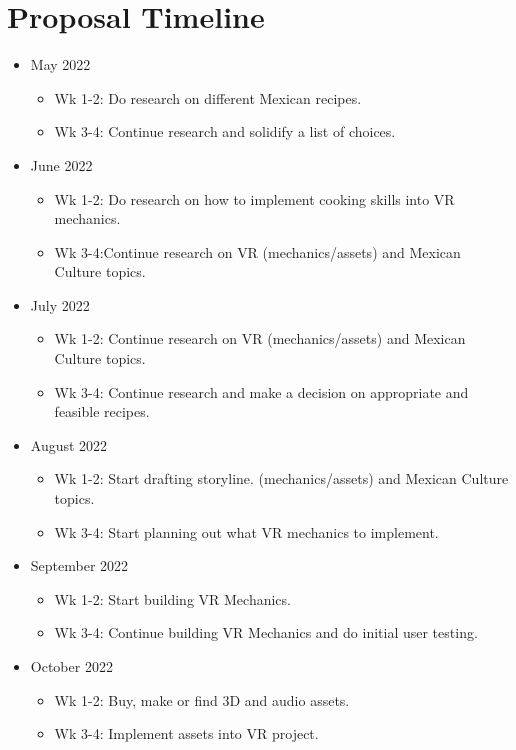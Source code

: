 \documentclass[11pt,twocolumn]{article}
\begin{document}
 \section{Proposal Timeline}
 \begin{itemize}
 
   \item May 2022
   \begin{itemize}
     \item Wk 1-2:  Do research on different Mexican recipes.
     \item Wk 3-4: Continue research and solidify a list of choices.
   \end{itemize}
   
   \item June 2022
   \begin{itemize}
     \item Wk 1-2: Do research on how to implement cooking skills into VR mechanics.
     \item Wk 3-4:Continue research on VR (mechanics/assets) and Mexican Culture topics.
   \end{itemize}
   
   \item July 2022
   \begin{itemize}
     \item Wk 1-2: Continue research on VR (mechanics/assets) and Mexican Culture topics.
     \item Wk 3-4:  Continue research and make a decision on appropriate and feasible recipes.
   \end{itemize}
   
   \item August 2022
   \begin{itemize}
     \item Wk 1-2: Start drafting storyline. (mechanics/assets) and Mexican Culture topics.
     \item Wk 3-4: Start planning out what VR mechanics to implement.
   \end{itemize}
   
   \item September 2022
   \begin{itemize}
     \item Wk 1-2: Start building VR Mechanics.
     \item Wk 3-4: Continue building VR Mechanics and do initial user testing.
   \end{itemize}
   
   \item October 2022
   \begin{itemize}
     \item Wk 1-2: Buy, make or find 3D and audio assets. 
     \item Wk 3-4: Implement assets into VR project.
   \end{itemize}
   

\end{itemize}
\end{document}
